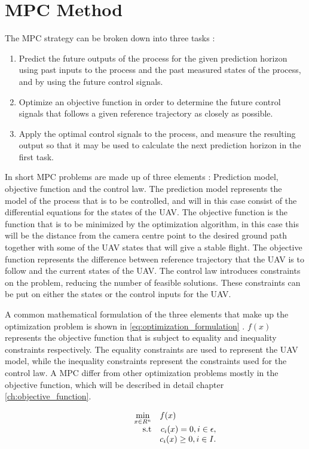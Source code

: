 \section{MPC Method}

The MPC strategy can be broken down into three tasks \cite{mpcCAMACHO}:

\begin{enumerate}
	\item Predict the future outputs of the process for the given prediction horizon using past inputs to the process and the past measured states of the process, and by using the future control signals.
	\item Optimize an objective function in order to determine the future control signals that follows a given reference trajectory as closely as possible.
	\item Apply the optimal control signals to the process, and measure the resulting output so that it may be used to calculate the next prediction horizon in the first task.
\end{enumerate}

In short MPC problems are made up of three elements \cite{mpcCAMACHO}: Prediction model, objective function and the control law. The prediction model represents the model of the process that is to be controlled, and will in this case consist of the differential equations for the states of the UAV. The objective function is the function that is to be minimized by the optimization algorithm, in this case this will be the distance from the camera centre point to the desired ground path together with some of the UAV states that will give a stable flight. The objective function represents the difference between reference trajectory that the UAV is to follow and the current states of the UAV. The control law introduces constraints on the problem, reducing the number of feasible solutions. These constraints can be put on either the states or the control inputs for the UAV.

A common mathematical formulation of the three elements that make up the optimization problem is shown in \ref{eq:optimization_formulation} \cite{nocedalOPTIMIZATION}. $f(x)$ represents the objective function that is subject to equality and inequality constraints respectively. The equality constraints are used to represent the UAV model, while the inequality constraints represent the constraints used for the control law. A MPC differ from other optimization problems mostly in the objective function, which will be described in detail chapter \ref{ch:objective_function}.

\begin{equation}
	\label{eq:optimization_formulation}
	\begin{array}{rrclcl}
		\displaystyle \min_{x \in R^n} & \multicolumn{3}{l}{f(x)} \\
		\textrm{s.t}
		& c_i(x) = 0, i \in \epsilon, \\
		& c_i(x) \geq 0, i \in I.
	\end{array}
\end{equation}